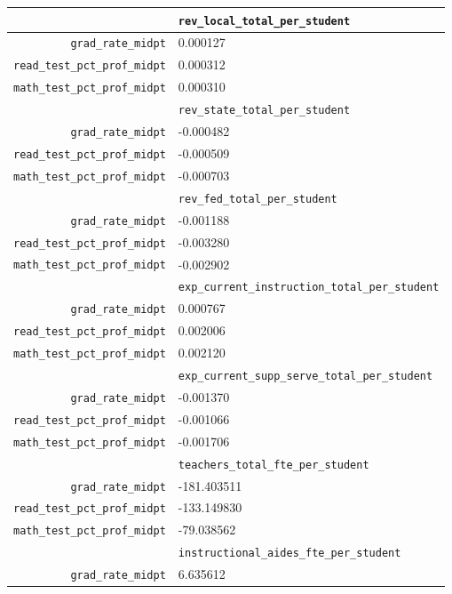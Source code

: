 \documentclass{article}
\newcommand*\rot{\multicolumn{1}{R{0}{1em}}}%
\renewcommand*\rot{}
\begin{document}
\begin{table}[H]
\centering
\begin{tabular}{r|l} \hline
& \rot{\texttt{rev\_local\_total\_per\_student}} \\ \hline
\texttt{grad\_rate\_midpt}            & 0.000127 \\
\texttt{read\_test\_pct\_prof\_midpt} & 0.000312 \\
\texttt{math\_test\_pct\_prof\_midpt} & 0.000310 \\ \hline
& \rot{\texttt{rev\_state\_total\_per\_student}} \\ \hline
\texttt{grad\_rate\_midpt}            & -0.000482 \\
\texttt{read\_test\_pct\_prof\_midpt} & -0.000509 \\
\texttt{math\_test\_pct\_prof\_midpt} & -0.000703 \\ \hline
& \rot{\texttt{rev\_fed\_total\_per\_student}} \\ \hline
\texttt{grad\_rate\_midpt}            &	-0.001188 \\
\texttt{read\_test\_pct\_prof\_midpt} &	-0.003280 \\
\texttt{math\_test\_pct\_prof\_midpt} &	-0.002902\\ \hline
& \rot{\texttt{exp\_current\_instruction\_total\_per\_student}} \\ \hline
\texttt{grad\_rate\_midpt}            &	0.000767 \\
\texttt{read\_test\_pct\_prof\_midpt} &	0.002006 \\
\texttt{math\_test\_pct\_prof\_midpt} &	0.002120 \\ \hline
& \rot{\texttt{exp\_current\_supp\_serve\_total\_per\_student}} \\ \hline
\texttt{grad\_rate\_midpt}            &	-0.001370 \\
\texttt{read\_test\_pct\_prof\_midpt} &	-0.001066 \\
\texttt{math\_test\_pct\_prof\_midpt} &	-0.001706 \\ \hline
& \rot{\texttt{teachers\_total\_fte\_per\_student}} \\ \hline
\texttt{grad\_rate\_midpt}            &	-181.403511 \\
\texttt{read\_test\_pct\_prof\_midpt} &	-133.149830 \\
\texttt{math\_test\_pct\_prof\_midpt} &	-79.038562  \\ \hline
& \rot{\texttt{instructional\_aides\_fte\_per\_student}} \\ \hline
\texttt{grad\_rate\_midpt}            &  6.635612  \\

\end{tabular}
\end{table}
\end{document}
